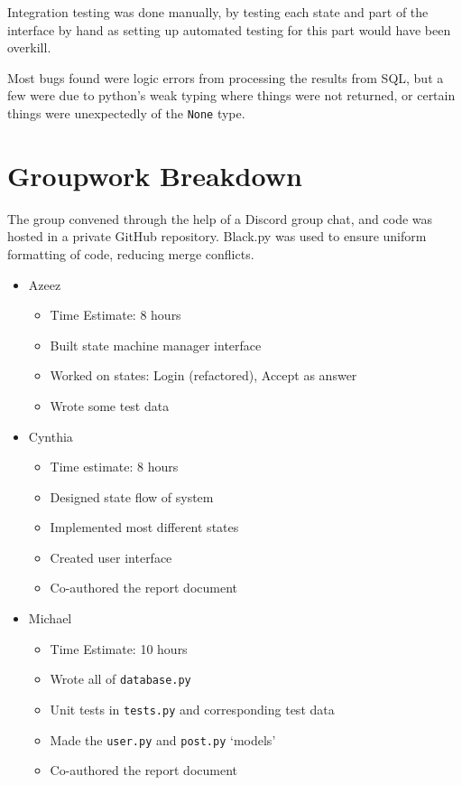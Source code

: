 \documentclass{article}
\begin{document}
Integration testing was done manually, by testing each state and part of the interface by hand as setting up automated testing for this part would have been overkill.

Most bugs found were logic errors from processing the results from SQL, but a few were due to python's weak typing where things were not returned, or certain things were unexpectedly of the \verb|None| type.

\section{Groupwork Breakdown}

The group convened through the help of a Discord group chat, and code was hosted in a private GitHub repository. Black.py was used to ensure uniform formatting of code, reducing merge conflicts.

\begin{itemize}
    \item Azeez
          \begin{itemize}
              \item Time Estimate: 8 hours
              \item Built state machine manager interface
              \item Worked on states: Login (refactored), Accept as answer
              \item Wrote some test data
          \end{itemize}
    \item Cynthia
          \begin{itemize}
              \item Time estimate: 8 hours
              \item Designed state flow of system
              \item Implemented most different states
              \item Created user interface
              \item Co-authored the report document
          \end{itemize}
    \item Michael
          \begin{itemize}
              \item Time Estimate: 10 hours
              \item Wrote all of \verb|database.py|
              \item Unit tests in \verb|tests.py| and corresponding test data
              \item Made the \verb|user.py| and \verb|post.py| `models'
              \item Co-authored the report document
          \end{itemize}
\end{itemize}
\end{document}
